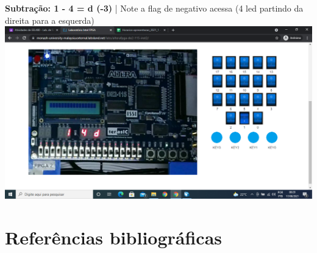 \documentclass{article}
\begin{document}
\begin{center}
\textbf{Subtração: 1 - 4 = d (-3)} | Note a flag de negativo acessa (4 led
    partindo da direita para a esquerda)
\includegraphics[width=\textwidth]{img/labsland_subtracao.png}
\end{center}

\section{Referências bibliográficas}
\end{document}
